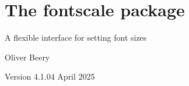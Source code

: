\documentclass{article}
\begin{document}
\section*{\Large The \textsf{fontscale} package}

A flexible interface for setting font sizes

Oliver Beery

Version 4.1.0\quad{}4 April 2025

\end{document}
